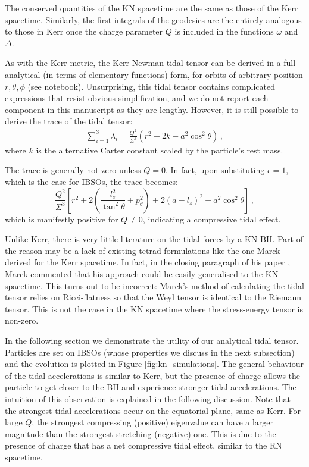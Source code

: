 \documentclass[
    reprint,
    prd,
    nofootinbib,
    amsmath,amssymb,
    aps,
    floatfix,
]{revtex4-2}
\begin{document}
The conserved quantities of the KN spacetime are the same as those of the Kerr spacetime. Similarly, the first integrals of the geodesics are the entirely analogous to those in Kerr once the charge parameter $Q$ is included in the functions $\omega$ and $\Delta$.

As with the  Kerr metric, the Kerr-Newman tidal tensor {can be derived in a full analytical (in terms of elementary functions) form, for orbits of arbitrary position $r, \theta, \phi$ (see notebook). Unsurprising, this tidal tensor } contains complicated expressions that resist {obvious} simplification, {and we do not report each component in this manuscript as they are lengthy}. However, it is still possible to derive the trace of the tidal tensor:
\begin{equation}
    \begin{split}
        \sum_{i=1}^{3} \lambda_{i} = \frac{Q^{2}}{\Sigma^{3}} (r^{2} + 2k - a^{2} \cos^{2}{\theta}) \, ,
    \end{split}
\end{equation}
where $k$ is the alternative Carter constant scaled by the particle's rest mass.

The trace is generally not zero unless $Q = 0$. In fact, upon substituting $\epsilon = 1$, which is the case for IBSOs, the trace becomes:
\begin{equation}
    \frac{Q^{2}}{\Sigma^{3}} \left[ r^{2} + 2 \left( \frac{l_{z}^{2}}{\tan^{2}{\theta}} + p_{\theta}^{2} \right) + 2(a - l_{z})^{2} - a^{2} \cos^{2}{\theta} \right] \, ,
\end{equation}
which is manifestly positive for $Q \neq 0$, indicating a compressive tidal effect.

Unlike Kerr, there is very little literature on the tidal forces by a KN BH. Part of the reason may be a lack of existing tetrad formulations like the one Marck derived for the Kerr spacetime. In fact, in the closing paragraph of his paper \cite{Marck1983}, Marck commented that his approach could be easily generalised to the KN spacetime. This turns out to be incorrect: Marck's method of calculating the tidal tensor relies on Ricci-flatness so that the Weyl tensor is identical to the Riemann tensor. This is not the case in the KN spacetime where the stress-energy tensor is non-zero.

{In the following section we demonstrate the utility of our analytical tidal tensor.}  Particles are set on IBSOs (whose properties we discuss in the next subsection) and the evolution is plotted in Figure \ref{fig:kn_simulations}. The general behaviour of the tidal accelerations is similar to Kerr, but the presence of charge allows the particle to get closer to the BH and experience stronger tidal accelerations. The intuition of this observation is explained in the following discussion. Note that the strongest tidal accelerations occur on the equatorial plane, same as Kerr. For large $Q$, the strongest compressing (positive) eigenvalue can have a larger magnitude than the strongest stretching (negative) one. This is due to the presence of charge that has a net compressive tidal effect, similar to the RN spacetime.
\end{document}
